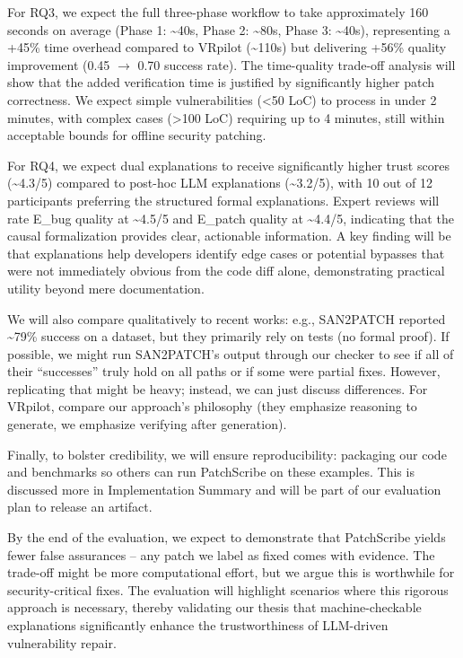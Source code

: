 \documentclass[conference,compsoc]{IEEEtran}
\begin{document}
For RQ3, we expect the full three-phase workflow to take approximately
160 seconds on average (Phase 1: \textasciitilde40s, Phase 2:
\textasciitilde80s, Phase 3: \textasciitilde40s), representing a +45\%
time overhead compared to VRpilot (\textasciitilde110s) but delivering
+56\% quality improvement (0.45 \(\rightarrow\) 0.70 success rate). The time-quality
trade-off analysis will show that the added verification time is
justified by significantly higher patch correctness. We expect simple
vulnerabilities (\textless50 LoC) to process in under 2 minutes, with
complex cases (\textgreater100 LoC) requiring up to 4 minutes, still
within acceptable bounds for offline security patching.

For RQ4, we expect dual explanations to receive significantly higher
trust scores (\textasciitilde4.3/5) compared to post-hoc LLM
explanations (\textasciitilde3.2/5), with 10 out of 12 participants
preferring the structured formal explanations. Expert reviews will rate
E\_bug quality at \textasciitilde4.5/5 and E\_patch quality at
\textasciitilde4.4/5, indicating that the causal formalization provides
clear, actionable information. A key finding will be that explanations
help developers identify edge cases or potential bypasses that were not
immediately obvious from the code diff alone, demonstrating practical
utility beyond mere documentation.

We will also compare qualitatively to recent works: e.g., SAN2PATCH
reported \textasciitilde79\% success on a dataset, but they primarily
rely on tests (no formal proof). If possible, we might run SAN2PATCH's
output through our checker to see if all of their ``successes'' truly
hold on all paths or if some were partial fixes. However, replicating
that might be heavy; instead, we can just discuss differences. For
VRpilot, compare our approach's philosophy (they emphasize reasoning to
generate, we emphasize verifying after generation).

Finally, to bolster credibility, we will ensure reproducibility:
packaging our code and benchmarks so others can run PatchScribe on these
examples. This is discussed more in Implementation Summary and will be
part of our evaluation plan to release an artifact.

By the end of the evaluation, we expect to demonstrate that PatchScribe
yields fewer false assurances -- any patch we label as fixed comes with
evidence. The trade-off might be more computational effort, but we argue
this is worthwhile for security-critical fixes. The evaluation will
highlight scenarios where this rigorous approach is necessary, thereby
validating our thesis that machine-checkable explanations significantly
enhance the trustworthiness of LLM-driven vulnerability repair.
\end{document}
